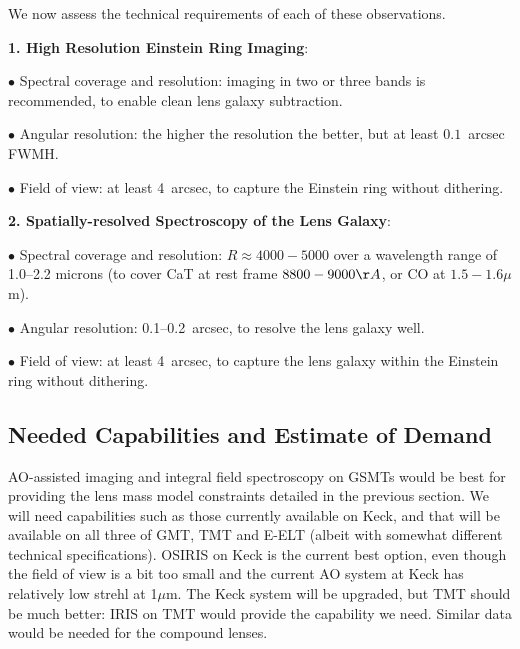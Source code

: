 We now assess the technical  requirements of each of these observations.

{\bf 1. High Resolution Einstein Ring Imaging}:

$\bullet$ Spectral coverage and resolution: imaging in two or three bands is
recommended, to enable clean lens galaxy subtraction.

$\bullet$ Angular resolution: the higher the resolution the better, but
at least $0.1$~arcsec FWMH.

$\bullet$ Field of view: at least 4~arcsec, to capture the Einstein
ring without dithering.


{\bf 2. Spatially-resolved Spectroscopy of the Lens Galaxy}:

$\bullet$ Spectral coverage and resolution: $R\approx4000-5000$  over a
wavelength range of 1.0--2.2 microns (to cover CaT at rest frame
$8800-9000\AA$, or CO at $1.5-1.6\mu$m).

$\bullet$ Angular resolution: 0.1--0.2~arcsec, to resolve the lens galaxy well.

$\bullet$ Field of view: at least 4~arcsec, to capture the lens galaxy
within the Einstein ring without dithering.



\subsection{Needed Capabilities and Estimate of Demand}


AO-assisted imaging and integral field spectroscopy on GSMTs would be
best for providing the lens mass model constraints detailed in the
previous section.  We will need capabilities such as those currently
available on Keck, and that will be available on all three of GMT, TMT
and E-ELT (albeit with somewhat different technical specifications).
OSIRIS on Keck is the current best option, even though the field of view
is a bit too small and the current AO system at Keck has relatively low
strehl at 1$\mu$m. The Keck system will be upgraded, but TMT should be
much better: IRIS on TMT would provide the capability we need. Similar
data would be needed for the compound lenses.

